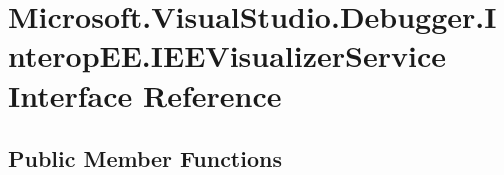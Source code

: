 \hypertarget{interface_microsoft_1_1_visual_studio_1_1_debugger_1_1_interop_e_e_1_1_i_e_e_visualizer_service}{\section{Microsoft.\+Visual\+Studio.\+Debugger.\+Interop\+E\+E.\+I\+E\+E\+Visualizer\+Service Interface Reference}
\label{interface_microsoft_1_1_visual_studio_1_1_debugger_1_1_interop_e_e_1_1_i_e_e_visualizer_service}
}
\subsection*{Public Member Functions}
